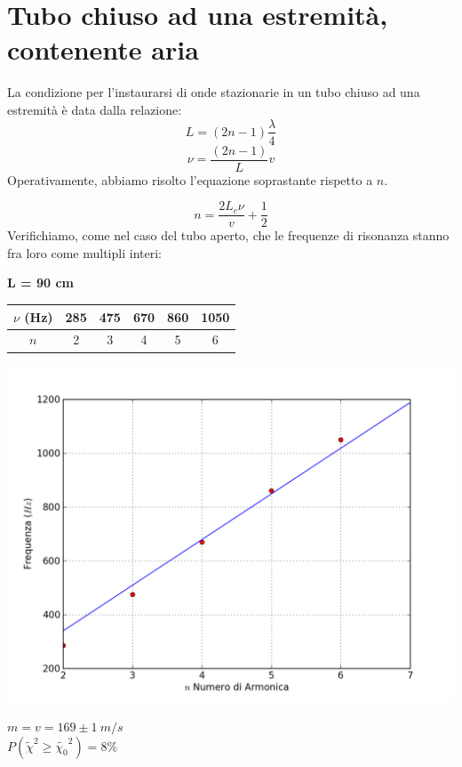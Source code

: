 \section{Tubo chiuso ad una estremità, contenente aria}

La condizione per l'instaurarsi di onde stazionarie in un tubo chiuso ad una estremità è data dalla relazione:
\\
\begin{equation}
 L=(2n-1)\frac{\lambda}{4}
\end{equation}
\begin{equation}\label{freq2}
\nu=\frac{(2n-1)}{L}v
\end{equation}
Operativamente, abbiamo risolto l'equazione soprastante rispetto a $n$.

$$ n = \frac{2L_c\nu}{v} + \frac{1}{2} $$
Verifichiamo, come nel caso del tubo aperto, che le frequenze di risonanza stanno fra loro come multipli interi: 

\textbf{L = 90 cm}
\\
\begin{center}
\begin{tabular}{c|c|c|c|c|c}
$\nu$ (Hz) & 285 & 475 & 670 & 860 & 1050 \\
\midrule
$n$ & 2 & 3 & 4 & 5 & 6 \\
\end{tabular}
\end{center}


\begin{center}
\includegraphics[scale=0.5]{../grafici/tubo/tubo2.png}

$m = v = 169\pm 1\ m/s$
\\

$P(\tilde{\chi}^2\geq\tilde{\chi_0}^2)=8\%$
\end{center}

